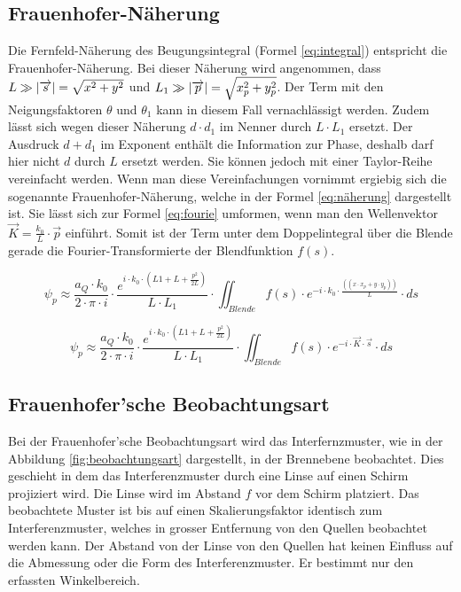 \newpage
\subsection{Frauenhofer-Näherung}
Die Fernfeld-Näherung des Beugungsintegral (Formel \ref{eq:integral}) entspricht die Frauenhofer-Näherung. Bei dieser Näherung wird angenommen, dass $ L\gg \arrowvert \overrightarrow{s} \arrowvert = \sqrt{x^2 + y^2} $ und $ L_{1} \gg \arrowvert \overrightarrow{p} \arrowvert = \sqrt{x_{p}^2 + y_{p}^2} $. Der Term mit den Neigungsfaktoren $ \theta $ und $ \theta_{1} $ kann in diesem Fall vernachlässigt werden. Zudem lässt sich wegen dieser Näherung $ d\cdot d_{1} $ im Nenner durch $ L\cdot L_{1} $ ersetzt. Der Ausdruck $ d + d_{1} $ im Exponent enthält die Information zur Phase, deshalb darf hier nicht $ d $ durch $ L $ ersetzt werden. Sie können jedoch mit einer Taylor-Reihe  vereinfacht werden. Wenn man diese Vereinfachungen vornimmt ergiebig sich die sogenannte Frauenhofer-Näherung, welche in der Formel \ref{eq:näherung} dargestellt ist. Sie lässt sich zur Formel \ref{eq:fourie} umformen, wenn man den Wellenvektor $ \overrightarrow{K} = \frac{k_{0}}{L} \cdot \overrightarrow{p}$ einführt. Somit ist der Term unter dem Doppelintegral über die Blende gerade die Fourier-Transformierte der Blendfunktion $ f(s) $.

\begin{equation}\label{eq:näherung}
\psi_{p}\approx \frac{a_{Q}\cdot k_{0}}{2\cdot \pi \cdot i} \cdot \frac{e^{i\cdot k_{0}\cdot (L1 +L+\frac{p^{2}}{2L})}}{L\cdot L_{1}} \cdot \iint_{Blende} f(s) \cdot e^{-i\cdot k_{0}\cdot \frac{((x\cdot x_{p} + y\cdot y_{p} ))}{L} } \cdot ds
\end{equation}

\begin{equation}\label{eq:fourie}
\psi_{p}\approx \frac{a_{Q}\cdot k_{0}}{2\cdot \pi \cdot i} \cdot \frac{e^{i\cdot k_{0}\cdot (L1 +L+\frac{p^{2}}{2L})}}{L\cdot L_{1}} \cdot \iint_{Blende} f(s) \cdot e^{-i\cdot \overrightarrow{K} \cdot \overrightarrow{s} } \cdot ds
\end{equation}

\newpage
\subsection{Frauenhofer'sche Beobachtungsart}
Bei der Frauenhofer'sche Beobachtungsart wird das Interfernzmuster, wie in der Abbildung \ref{fig:beobachtungsart} dargestellt, in der Brennebene beobachtet. Dies geschieht in dem das Interferenzmuster durch eine Linse auf einen Schirm projiziert wird. Die Linse wird im Abstand $ f $ vor dem Schirm platziert. Das beobachtete Muster ist bis auf einen Skalierungsfaktor identisch zum Interferenzmuster, welches in grosser Entfernung von den Quellen beobachtet werden kann. Der Abstand von der Linse von den Quellen hat keinen Einfluss auf die Abmessung oder die Form des Interferenzmuster. Er bestimmt nur den erfassten Winkelbereich.

